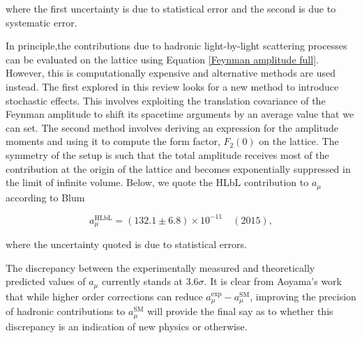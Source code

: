 \documentclass{article}
\numberwithin{equation}{section} %
\begin{document}
\noindent where the first uncertainty is due to statistical error and the second is due to systematic error.

In principle,the contributions due to hadronic light-by-light scattering processes can be evaluated on the lattice using Equation \ref{Feynman amplitude full}. However, this is computationally expensive and alternative methods are used instead. The first explored in this review looks for a new method to introduce stochastic effects. This involves exploiting the translation covariance of the Feynman amplitude to shift its spacetime arguments by an average value that we can set. The second method involves deriving an expression for the amplitude moments and using it to compute the form factor, $F_2(0)$ on the lattice. The symmetry of the setup is such that the total amplitude receives most of the contribution at the origin of the lattice and becomes exponentially suppressed in the limit of infinite volume. Below, we quote the HLbL contribution to $a_\mu$ according to Blum\cite{blum}

\begin{equation}
a_\mu^\mathrm{HLbL} = (132.1 \pm 6.8) \times 10^{-11}\quad(2015),
\end{equation}

\noindent where the uncertainty quoted is due to statistical errors.

The discrepancy between the experimentally measured and theoretically predicted values of $a_\mu$ currently stands at 3.6$\sigma$\cite{lehnerg2}. It is clear from Aoyama's work\cite{aoyama} that while higher order corrections can reduce $a_\mu^\mathrm{exp} - a_\mu^\mathrm{SM}$, improving the precision of hadronic contributions to $a_\mu^\mathrm{SM}$ will provide the final say as to whether this discrepancy is an indication of new physics or otherwise. 



\newpage

\end{document}
